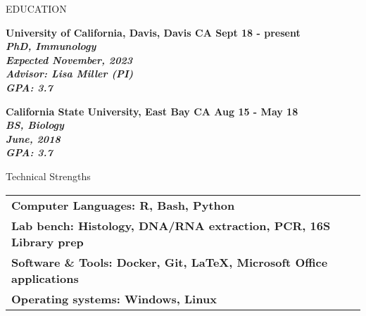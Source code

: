 \documentclass{resume} %
\begin{document}

\begin{rSection}{EDUCATION}

\bf University of California, Davis, Davis CA
\hfill Sept 18 - present\\
\sl PhD, Immunology \\
\textit{Expected} November, 2023\\
\textit{Advisor:} Lisa Miller (PI) \\
\hfill GPA: 3.7

\bf California State University, East Bay CA 
\hfill Aug 15 - May 18\\
\sl BS, Biology \\
\textit June, 2018 \\
\hfill GPA: 3.7

\end{rSection}


\begin{rSection}{Technical Strengths}

\begin{tabular}{ @{} >{\bfseries}l @{\hspace{6ex}}}
Computer Languages: R, Bash, Python \\
Lab bench: Histology, DNA/RNA extraction, PCR, 16S Library prep \\
Software \& Tools: Docker, Git, LaTeX, Microsoft Office applications \\
Operating systems: Windows, Linux
\end{tabular}

\end{rSection}

\end{document}
